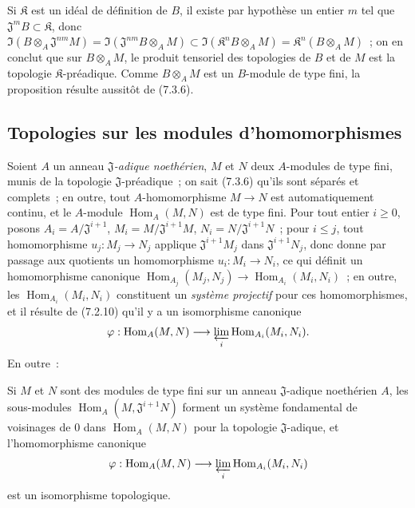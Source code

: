 Si $\mathfrak K$ est un idéal de définition de $B$, il existe par hypothèse
un entier $m$ tel que $\mathfrak J^mB\subset\mathfrak K$, donc
$\Im(B\otimes_A\mathfrak J^{nm}M)=
\Im(\mathfrak J^{nm}B\otimes_A M)\subset
\Im(\mathfrak K^nB\otimes_A M)=\mathfrak K^n(B\otimes_A M)$~; on en
conclut que sur $B\otimes_A M$, le produit tensoriel des topologies de $B$
et de $M$ est la topologie $\mathfrak K$-préadique. Comme $B\otimes_A M$
est un $B$-module de type fini, la proposition résulte aussitôt de (7.3.6).

\subsection{Topologies sur les modules d'homomorphismes}
\label{subsection:0.7.8-fr}

\begin{env}[7.8.1]
\label{0.7.8.1-fr}
Soient $A$ un anneau \emph{$\mathfrak J$-adique noethérien}, $M$ et $N$ deux
$A$-modules de type fini, munis de la topologie $\mathfrak J$-préadique~;
on sait (7.3.6) qu'ils sont séparés et complets~; en outre, tout
$A$-homomorphisme $M\to N$ est automatiquement continu, et le $A$-module
$\operatorname{Hom}_A(M,N)$ est de type fini. Pour tout entier $i\geq 0$, posons
$A_i=A/\mathfrak J^{i+1}$, $M_i=M/\mathfrak J^{i+1}M$,
$N_i=N/\mathfrak J^{i+1}N$~; pour $i\leq j$, tout homomorphisme
$u_j:M_j\to N_j$ applique $\mathfrak J^{i+1}M_j$ dans
$\mathfrak J^{i+1}N_j$, donc donne par passage aux quotients un
homomorphisme $u_i:M_i\to N_i$, ce qui définit un homomorphisme canonique
$\operatorname{Hom}_{A_j}(M_j,N_j)\to\operatorname{Hom}_{A_i}(M_i,N_i)$~; en outre, les
$\operatorname{Hom}_{A_i}(M_i,N_i)$ constituent un \emph{système projectif} pour ces
homomorphismes, et il résulte de (7.2.10) qu'il y a un isomorphisme
canonique
\[
  \varphi:\operatorname{Hom}_A(M,N)\longrightarrow
  \varprojlim_i\operatorname{Hom}_{A_i}(M_i,N_i).
\]
En outre~:
\end{env}

\begin{proposition}[7.8.2]
\label{0.7.8.2-fr}
Si $M$ et $N$ sont des modules de type fini sur un anneau $\mathfrak J$-adique
noethérien $A$, les sous-modules $\operatorname{Hom}_A(M,\mathfrak J^{i+1}N)$ forment un
système fondamental de voisinages de $0$ dans $\operatorname{Hom}_A(M,N)$ pour la
topologie $\mathfrak J$-adique, et l'homomorphisme canonique
\[
  \varphi:\operatorname{Hom}_A(M,N)\longrightarrow
  \varprojlim_i\operatorname{Hom}_{A_i}(M_i,N_i)
\]
est un isomorphisme topologique.
\end{proposition}

